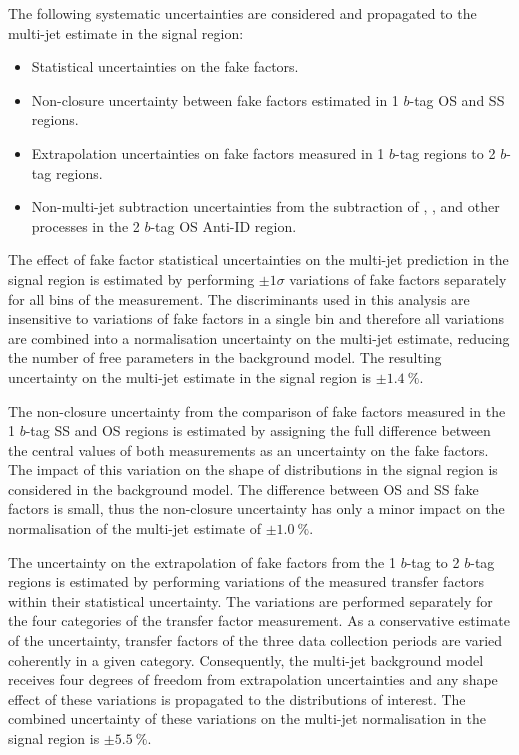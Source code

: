 The following systematic uncertainties are considered and propagated
to the multi-jet estimate in the \hadhad signal region:
\begin{itemize}

\item Statistical uncertainties on the fake factors.

\item Non-closure uncertainty between fake factors estimated in 1
  $b$-tag OS and SS regions.

\item Extrapolation uncertainties on fake factors measured in 1
  $b$-tag regions to 2 $b$-tag regions.

\item Non-multi-jet subtraction uncertainties from the subtraction of
  \ttbar, \ttbarFakes, and other processes in the 2 $b$-tag OS Anti-ID
  region.

\end{itemize}

The effect of fake factor statistical uncertainties on the multi-jet
prediction in the signal region is estimated by performing
$\pm 1 \sigma$ variations of fake factors separately for all bins of
the measurement. The discriminants used in this analysis are
insensitive to variations of fake factors in a single bin and
therefore all variations are combined into a normalisation uncertainty
on the multi-jet estimate, reducing the number of free parameters in
the background model. The resulting uncertainty on the multi-jet
estimate in the signal region is $\pm \SI{1.4}{\percent}$.

The non-closure uncertainty from the comparison of fake factors
measured in the 1 $b$-tag SS and OS regions is estimated by assigning
the full difference between the central values of both measurements as
an uncertainty on the fake factors. The impact of this variation on
the shape of distributions in the signal region is considered in the
background model. The difference between OS and SS fake factors is
small, thus the non-closure uncertainty has only a minor impact on the
normalisation of the multi-jet estimate of $\pm \SI{1.0}{\percent}$.

The uncertainty on the extrapolation of fake factors from the 1
$b$-tag to 2 $b$-tag regions is estimated by performing variations of
the measured transfer factors within their statistical
uncertainty. The variations are performed separately for the four
categories of the transfer factor measurement. As a conservative
estimate of the uncertainty, transfer factors of the three data
collection periods are varied coherently in a given
category. Consequently, the multi-jet background model receives four
degrees of freedom from extrapolation uncertainties and any shape
effect of these variations is propagated to the distributions of
interest. The combined uncertainty of these variations on the
multi-jet normalisation in the signal region is
$\pm \SI{5.5}{\percent}$.

